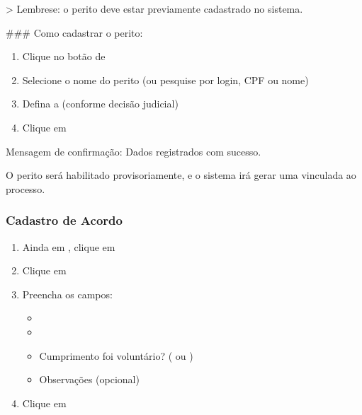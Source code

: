 \documentclass[letterpaper,10pt,brazil]{sphinxmanual}
\begin{document}
\sphinxAtStartPar
\textgreater{} Lembre\sphinxhyphen{}se: o perito deve estar previamente cadastrado no sistema.

\sphinxAtStartPar
\#\#\# Como cadastrar o perito:
\begin{enumerate}
%
\item {} 
\sphinxAtStartPar
Clique no botão de 

\item {} 
\sphinxAtStartPar
Selecione o nome do perito (ou pesquise por login, CPF ou nome)

\item {} 
\sphinxAtStartPar
Defina a  (conforme decisão judicial)

\item {} 
\sphinxAtStartPar
Clique em 

\end{enumerate}

\sphinxAtStartPar
Mensagem de confirmação:
Dados registrados com sucesso.

\sphinxAtStartPar
O perito será habilitado provisoriamente, e o sistema irá gerar uma  vinculada ao processo.


\subsubsection{Cadastro de Acordo}
\label{\detokenize{projud_22_cadastroperiodo:cadastro-de-acordo}}\begin{enumerate}
%
\item {} 
\sphinxAtStartPar
Ainda em , clique em 

\item {} 
\sphinxAtStartPar
Clique em 

\item {} 
\sphinxAtStartPar
Preencha os campos:
\begin{itemize}
\item {} 
\sphinxAtStartPar
{}

\item {} 
\sphinxAtStartPar
{}

\item {} 
\sphinxAtStartPar
Cumprimento foi voluntário? ( ou )

\item {} 
\sphinxAtStartPar
Observações (opcional)

\end{itemize}

\item {} 
\sphinxAtStartPar
Clique em 

\end{enumerate}
\end{document}
